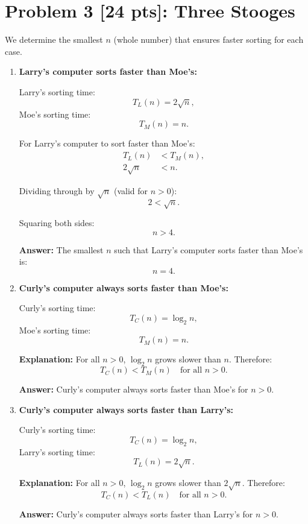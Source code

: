 \documentclass[10pt]{article}
\begin{document}
\section*{Problem 3 [24 pts]: Three Stooges}

We determine the smallest \( n \) (whole number) that ensures faster sorting for each case.

\begin{enumerate}
  \item \textbf{Larry's computer sorts faster than Moe's:}

    Larry’s sorting time:
    \[
      T_L(n) = 2\sqrt{n},
    \]
    Moe’s sorting time:
    \[
      T_M(n) = n.
    \]

    For Larry's computer to sort faster than Moe's:
    \begin{align*}
      T_L(n) &< T_M(n), \\
      2\sqrt{n} &< n.
    \end{align*}

    Dividing through by \( \sqrt{n} \) (valid for \( n > 0 \)):
    \[
      2 < \sqrt{n}.
    \]

    Squaring both sides:
    \[
      n > 4.
    \]

    \textbf{Answer:} The smallest \( n \) such that Larry’s computer sorts faster than Moe’s is:
    \[
      n = 4.
    \]
    \newline

  \item \textbf{Curly's computer always sorts faster than Moe's:}

    Curly’s sorting time:
    \[
      T_C(n) = \log_2 n,
    \]
    Moe’s sorting time:
    \[
      T_M(n) = n.
    \]

    \textbf{Explanation:} For all \( n > 0 \), \( \log_2 n \) grows slower than \( n \). Therefore:
    \[
      T_C(n) < T_M(n) \quad \text{for all } n > 0.
    \]

    \textbf{Answer:} Curly’s computer always sorts faster than Moe's for \( n > 0 \).
    \newline

  \item \textbf{Curly's computer always sorts faster than Larry's:}

    Curly’s sorting time:
    \[
      T_C(n) = \log_2 n,
    \]
    Larry’s sorting time:
    \[
      T_L(n) = 2\sqrt{n}.
    \]

    \textbf{Explanation:} For all \( n > 0 \), \( \log_2 n \) grows slower than \( 2\sqrt{n} \). Therefore:
    \[
      T_C(n) < T_L(n) \quad \text{for all } n > 0.
    \]

    \textbf{Answer:} Curly’s computer always sorts faster than Larry’s for \( n > 0 \).
\end{enumerate}
\end{document}

